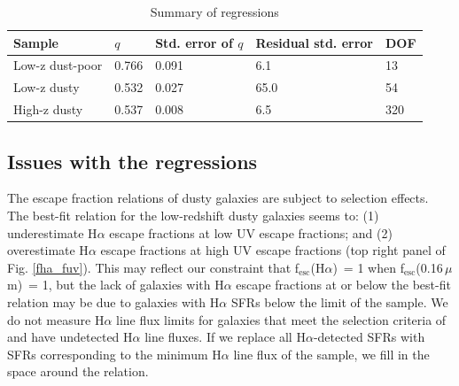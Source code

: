 \documentclass[referee]{aa}
\newcommand{\alephuv}{f$_{\mathrm{esc}}$(0.16$\,\mu$m)}
\newcommand{\alephha}{f$_{\mathrm{esc}}$(H$\alpha$)}
\newcommand{\alephuvha}{f$_{\mathrm{esc}}$(0.66$\,\mu$m)}
\begin{document}
\begin{table}
\caption{Summary of regressions\label{regress}}
\begin{tabular}{lllll}
\hline \hline
Sample &
$q$ &
Std. error of $q$ &
Residual std. error &
DOF \\
\hline
Low-z dust-poor & 0.766 & 0.091 & 6.1 & 13 \\
Low-z dusty     & 0.532 & 0.027 & 65.0 & 54 \\
High-z dusty    & 0.537 & 0.008 & 6.5 & 320 \\
\hline
\end{tabular}
\end{table}


\subsection{Issues with the regressions}\label{subsec:select}

The escape fraction relations of dusty galaxies are subject to selection
effects.  The best-fit relation for the low-redshift dusty galaxies seems to:
(1) underestimate H$\alpha$ escape fractions at low UV escape fractions; and (2)
overestimate H$\alpha$ escape fractions at high UV escape fractions (top
right panel of Fig. \ref{fha_fuv}).  This may reflect our constraint that
\alephha~= 1 when
\alephuv~= 1, but the lack of galaxies with H$\alpha$ escape fractions at or
below the best-fit relation may be due to galaxies with H$\alpha$ SFRs below the limit
of the sample.  We do not measure H$\alpha$ line flux limits for galaxies that
meet the selection criteria of \citet{hwang13} and have undetected H$\alpha$
line fluxes.  If we replace all H$\alpha$-detected SFRs with SFRs corresponding
to the minimum H$\alpha$ line flux of the sample, we fill in the space around
the relation.
\end{document}
